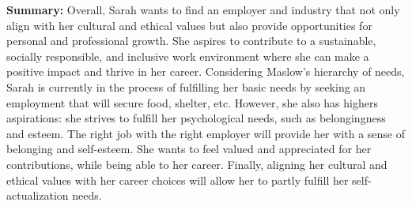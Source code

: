 \noindent\textbf{Summary:}
Overall, Sarah wants to find an employer and industry that not only align with her cultural and ethical values but also provide
opportunities for personal and professional growth. She aspires to contribute to a sustainable, socially responsible, and inclusive
work environment where she can make a positive impact and thrive in her career.
Considering Maslow's hierarchy of needs, Sarah is currently in the process of fulfilling her basic needs by seeking an employment
that will secure food, shelter, etc. However, she also has highers aspirations: she strives to fulfill her psychological needs, such as
belongingness and esteem. The right job with the right employer will provide her with a sense of belonging and self-esteem. She wants to
feel valued and appreciated for her contributions, while being able to her career. Finally, aligning her cultural and ethical values with
her career choices will allow her to partly fulfill her self-actualization needs.
